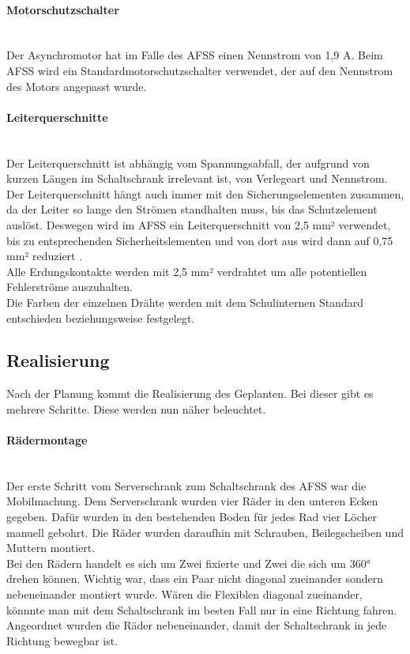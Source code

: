     \paragraph{Motorschutzschalter}\mbox{}\\
    Der Asynchromotor hat im Falle des AFSS einen Nennstrom von 1,9 A. Beim AFSS wird ein Standardmotorschutzschalter verwendet, der auf den Nennstrom des Motors angepasst wurde. 
    \paragraph{Leiterquerschnitte}\mbox{}\\
    Der Leiterquerschnitt ist abhängig vom Spannungsabfall, der aufgrund von kurzen Längen im Schaltschrank irrelevant ist, von Verlegeart und Nennstrom. Der Leiterquerschnitt hängt auch immer mit den Sicherungselementen zusammen, da der Leiter so lange den Strömen standhalten muss, bis das Schutzelement auslöst. Deswegen wird im AFSS ein Leiterquerschnitt von 2,5 mm² verwendet, bis zu entsprechenden Sicherheitslementen und von dort aus wird dann auf 0,75 mm² reduziert \cite{SeyrRösch}.\\ 
    Alle Erdungskontakte werden mit 2,5 mm² verdrahtet um alle potentiellen Fehlerströme auszuhalten.\\
    Die Farben der einzelnen Drähte werden mit dem Schulinternen Standard entschieden beziehungsweise festgelegt.
\subsection{Realisierung}
    Nach der Planung kommt die Realisierung des Geplanten. Bei dieser gibt es mehrere Schritte. Diese werden nun näher beleuchtet.
    \paragraph{Rädermontage}\mbox{}\\
    Der erste Schritt vom Serverschrank zum Schaltschrank des AFSS war die Mobilmachung. Dem Serverschrank wurden vier Räder in den unteren Ecken gegeben. Dafür wurden in den bestehenden Boden für jedes Rad vier Löcher manuell gebohrt. Die Räder wurden daraufhin mit Schrauben, Beilegscheiben und Muttern montiert.\\
    Bei den Rädern handelt es sich um Zwei fixierte und Zwei die sich um 360° drehen können. Wichtig war, dass ein Paar nicht diagonal zueinander sondern nebeneinander montiert wurde. Wären die Flexiblen diagonal zueinander, könnnte man mit dem Schaltschrank im besten Fall nur in eine Richtung fahren. Angeordnet wurden die Räder nebeneinander, damit der Schaltschrank in jede Richtung bewegbar ist.  
